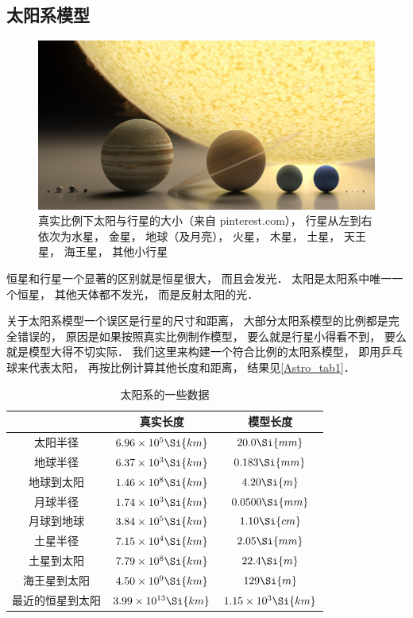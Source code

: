 
\subsection{太阳系模型}

\begin{figure}[ht]
\centering
\includegraphics[width=14cm]{./figures/Astro1.png}
\caption{真实比例下太阳与行星的大小（来自 pinterest.com）， 行星从左到右依次为水星， 金星， 地球（及月亮）， 火星， 木星， 土星， 天王星， 海王星， 其他小行星} \label{Astro_fig1}
\end{figure}

恒星和行星一个显著的区别就是恒星很大， 而且会发光． 太阳是太阳系中唯一一个恒星， 其他天体都不发光， 而是反射太阳的光．

关于太阳系模型一个误区是行星的尺寸和距离， 大部分太阳系模型的比例都是完全错误的， 原因是如果按照真实比例制作模型， 要么就是行星小得看不到， 要么就是模型大得不切实际． 我们这里来构建一个符合比例的太阳系模型， 即用乒乓球来代表太阳， 再按比例计算其他长度和距离， 结果见\autoref{Astro_tab1}．

\begin{table}[ht]
\centering
\caption{太阳系的一些数据}\label{Astro_tab1}
\begin{tabular}{|c|c|c|}
\hline
 & 真实长度 & 模型长度 \\
\hline
太阳半径 & $6.96\times 10^5 \Si{km}$ & $20.0 \Si{mm}$\\
\hline
地球半径 &  $6.37\times 10^3 \Si{km}$ & $0.183 \Si{mm}$\\
\hline
地球到太阳  &  $1.46 \times 10^8 \Si{km}$ & $4.20 \Si{m}$\\
\hline
月球半径 & $1.74 \times 10^3 \Si{km}$ & $0.0500 \Si{mm}$\\
\hline
月球到地球 & $3.84 \times 10^5 \Si{km}$ &  $1.10 \Si{cm}$\\
\hline
土星半径 & $7.15 \times 10^4 \Si{km}$ & $2.05 \Si{mm}$\\
\hline
土星到太阳 & $7.79 \times 10^8 \Si{km}$ & $22.4 \Si{m}$\\
\hline
海王星到太阳 & $4.50 \times 10^9 \Si{km}$ & $129 \Si{m}$\\
\hline
最近的恒星到太阳 & $3.99 \times 10^{13} \Si{km}$ &  $1.15 \times 10^3 \Si{km}$\\
\hline
\end{tabular}
\end{table}

